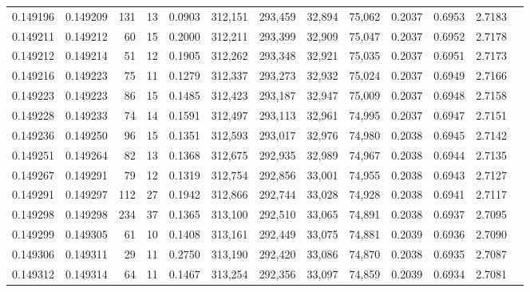 \begin{tabular}{rrrrrrrrrrrrr}
0.149196 & 0.149209 &   131 &  13 &                                     0.0903 & 312,151 & 293,459 &  32,894 &  75,062 & 0.2037 & 0.6953 & 2.7183 \\
0.149211 & 0.149212 &    60 &  15 &                                     0.2000 & 312,211 & 293,399 &  32,909 &  75,047 & 0.2037 & 0.6952 & 2.7178 \\
0.149212 & 0.149214 &    51 &  12 &                                     0.1905 & 312,262 & 293,348 &  32,921 &  75,035 & 0.2037 & 0.6951 & 2.7173 \\
0.149216 & 0.149223 &    75 &  11 &                                     0.1279 & 312,337 & 293,273 &  32,932 &  75,024 & 0.2037 & 0.6949 & 2.7166 \\
0.149223 & 0.149223 &    86 &  15 &                                     0.1485 & 312,423 & 293,187 &  32,947 &  75,009 & 0.2037 & 0.6948 & 2.7158 \\
0.149228 & 0.149233 &    74 &  14 &                                     0.1591 & 312,497 & 293,113 &  32,961 &  74,995 & 0.2037 & 0.6947 & 2.7151 \\
0.149236 & 0.149250 &    96 &  15 &                                     0.1351 & 312,593 & 293,017 &  32,976 &  74,980 & 0.2038 & 0.6945 & 2.7142 \\
0.149251 & 0.149264 &    82 &  13 &                                     0.1368 & 312,675 & 292,935 &  32,989 &  74,967 & 0.2038 & 0.6944 & 2.7135 \\
0.149267 & 0.149291 &    79 &  12 &                                     0.1319 & 312,754 & 292,856 &  33,001 &  74,955 & 0.2038 & 0.6943 & 2.7127 \\
0.149291 & 0.149297 &   112 &  27 &                                     0.1942 & 312,866 & 292,744 &  33,028 &  74,928 & 0.2038 & 0.6941 & 2.7117 \\
0.149298 & 0.149298 &   234 &  37 &                                     0.1365 & 313,100 & 292,510 &  33,065 &  74,891 & 0.2038 & 0.6937 & 2.7095 \\
0.149299 & 0.149305 &    61 &  10 &                                     0.1408 & 313,161 & 292,449 &  33,075 &  74,881 & 0.2039 & 0.6936 & 2.7090 \\
0.149306 & 0.149311 &    29 &  11 &                                     0.2750 & 313,190 & 292,420 &  33,086 &  74,870 & 0.2038 & 0.6935 & 2.7087 \\
0.149312 & 0.149314 &    64 &  11 &                                     0.1467 & 313,254 & 292,356 &  33,097 &  74,859 & 0.2039 & 0.6934 & 2.7081 \\

\end{tabular}
